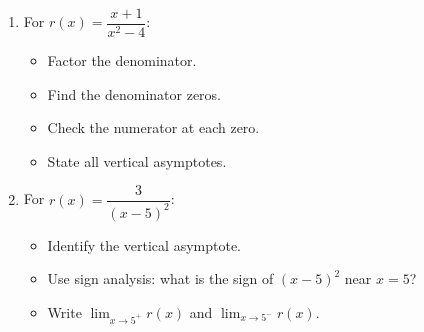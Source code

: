\documentclass[aspectratio=169, 11pt]{beamer}
\begin{document}
\begin{frame}[t, plain]

  \begin{enumerate}\setlength{\itemsep}{10pt}
    \item For $r(x) = \dfrac{x + 1}{x^2 - 4}$:
          \begin{itemize}\setlength{\itemsep}{4pt}
            \item Factor the denominator.
            \item Find the denominator zeros.
            \item Check the numerator at each zero.
            \item State all vertical asymptotes.
          \end{itemize}

    \item For $r(x) = \dfrac{3}{(x - 5)^2}$:
          \begin{itemize}\setlength{\itemsep}{4pt}
            \item Identify the vertical asymptote.
            \item Use sign analysis: what is the sign of $(x-5)^2$ near $x=5$?
            \item Write $\displaystyle\lim_{x \to 5^+} r(x)$ and $\displaystyle\lim_{x \to 5^-} r(x)$.
          \end{itemize}
  \end{enumerate}
\end{frame}
\end{document}
